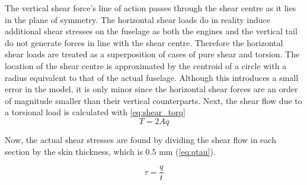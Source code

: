 
The vertical shear force's line of action passes through the shear centre as it lies in the plane of symmetry. The horizontal shear loads do in reality induce additional shear stresses on the fuselage as both the engines and the vertical tail do not generate forces in line with the shear centre. Therefore the horizontal shear loads are treated as a superposition of cases of pure shear and torsion. The location of the shear centre is approximated by the centroid of a circle with a radius equivalent to that of the actual fuselage. Although this introduces a small error in the model, it is only minor since the horizontal shear forces are an order of magnitude smaller than their vertical counterparts. Next, the shear flow due to a torsional load is calculated with \autoref{eq:shear_torq}
\begin{equation}
\label{eq:shear_torq}
    T = 2Aq
\end{equation}



Now, the actual shear stresses are found by dividing the shear flow in each section by the skin thickness, which is 0.5 mm (\autoref{eq:qtau}).

\begin{equation}
\label{eq:qtau}
    \tau = \frac{q}{t}
\end{equation}

